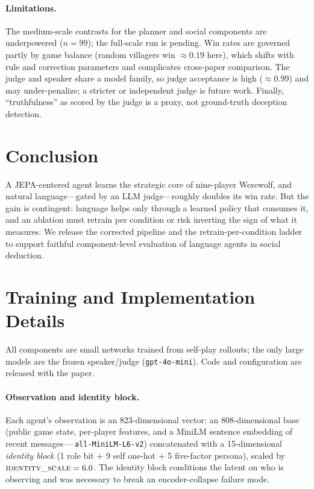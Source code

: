 \documentclass[11pt]{article}
\begin{document}
\paragraph{Limitations.} The medium-scale contrasts for the planner and social
components are underpowered ($n=99$); the full-scale run is pending. Win rates are
governed partly by game balance (random villagers win $\approx\!0.19$ here), which
shifts with rule and correction parameters and complicates cross-paper comparison.
The judge and speaker share a model family, so judge acceptance is high
($\approx\!0.99$) and may under-penalize; a stricter or independent judge is
future work. Finally, ``truthfulness'' as scored by the judge is a proxy, not
ground-truth deception detection.

\section{Conclusion}
A JEPA-centered agent learns the strategic core of nine-player Werewolf, and
natural language---gated by an LLM judge---roughly doubles its win rate. But the
gain is contingent: language helps only through a learned policy that consumes it,
and an ablation must retrain per condition or risk inverting the sign of what it
measures. We release the corrected pipeline and the retrain-per-condition ladder
to support faithful component-level evaluation of language agents in social
deduction.

\appendix
\section{Training and Implementation Details}
\label{sec:appendix}
All components are small networks trained from self-play rollouts; the only large
models are the frozen speaker/judge (\texttt{gpt-4o-mini}). Code and configuration
are released with the paper.

\paragraph{Observation and identity block.} Each agent's observation is an
823-dimensional vector: an 808-dimensional base (public game state, per-player
features, and a MiniLM sentence embedding of recent
messages\,---\,\texttt{all-MiniLM-L6-v2}) concatenated with a 15-dimensional
\emph{identity block} (1 role bit $+$ 9 self one-hot $+$ 5 five-factor persona),
scaled by $\textsc{identity\_scale}=6.0$. The identity block conditions the latent on
who is observing and was necessary to break an encoder-collapse failure mode.
\end{document}

